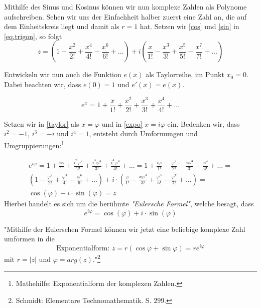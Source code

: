 \documentclass[a4paper,12pt]{article} %
\begin{document}
Mithilfe des Sinus und Kosinus können wir nun komplexe Zahlen als Polynome aufschreiben. Sehen wir uns der Einfachheit halber zuerst eine Zahl an, die auf dem Einheitskreis liegt und damit als $r=1$ hat. Setzen wir \eqref{cos} und \eqref{sin} in \eqref{eq.trigon}, so folgt
\begin{equation}\label{taylor}
	z=%
	\left(1-\frac{x^2}{2!}+\frac{x^4}{4!}-\frac{x^6}{6!}+\dots\right)+i\left(\frac{x}{1!}-\frac{x^3}{3!}+\frac{x^5}{5!}-\frac{x^7}{7!}+\dots\right)
\end{equation}

Entwickeln wir nun auch die Funktion $e(x)$ als Taylorreihe, im Punkt $x_0=0$.
Dabei beachten wir, dass $e(0)=1$ und $e\prime(x)=e(x)$.

\begin{equation}\label{expo}
	e^x=1+\frac{x}{1!}+\frac{x^2}{2!}+\frac{x^3}{3!}+\frac{x^4}{4!}+\dots
\end{equation}




Setzen wir in \eqref{taylor} als $x=\varphi$ und in \eqref{expo} $x=i\varphi$ ein.
Bedenken wir, dass $i^2=-1$, $i^3=-i$ und $i^4=1$, entsteht durch Umformungen und Umgruppierungen:\footnote{Mathehilfe: Exponentialform der komplexen Zahlen.}

\begin{multline}
	e^{i\varphi}=1+\frac{i\varphi}{1!}+\frac{i^2\varphi^2}{2!}+\frac{i^3\varphi^3}{3!}+\frac{i^4\varphi^4}{4!}+\dots=
	1+\frac{i\varphi}{1!}-\frac{\varphi^2}{2!}-\frac{i\varphi^3}{3!}+\frac{\varphi^4}{4!}+\dots=\\
	\left(1-\frac{\varphi^2}{2!}+\frac{\varphi^4}{4!}-\frac{\varphi^6}{6!}+\dots\right)+i\cdot\left(\frac{\varphi}{1!}-\frac{x\varphi^3}{3!}+\frac{\varphi^5}{5!}-\frac{\varphi^7}{7!}+\dots\right) =\\
	\cos(\varphi) + i\cdot \sin(\varphi)=z
\end{multline}
Hierbei handelt es sich um die berühmte \emph{"{}Eulersche Formel"}, welche besagt, dass
\begin{equation} \label{euler}
	e^{i\varphi}=\cos(\varphi)+i\cdot \sin(\varphi)
\end{equation}

"Mithilfe der Eulerschen Formel können wir jetzt eine beliebige komplexe Zahl umformen in die
\begin{equation}
	\textrm{Exponentialform:  } z=r(\cos \varphi + \sin \varphi)= r e^{i\varphi}
\end{equation}
mit $r=|z|$ und $\varphi=arg(z)$."\footnote{{Schmidt: Elementare Technomathematik. S. $299$.}}\\
\end{document}
